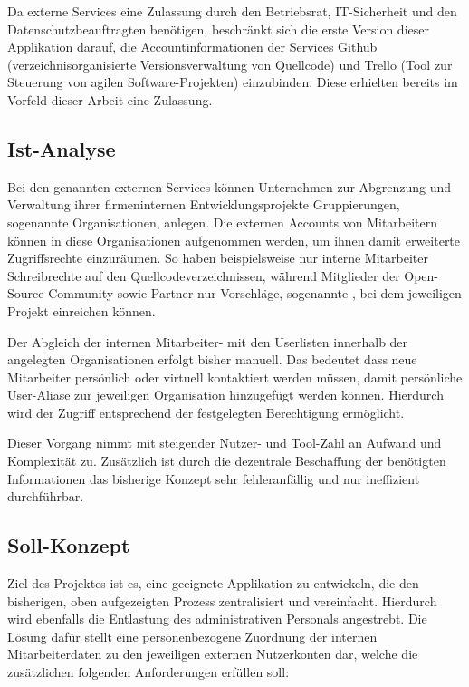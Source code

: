 Da externe Services eine Zulassung durch den Betriebsrat, IT-Sicherheit und den Datenschutzbeauftragten
benötigen, beschränkt sich die erste Version dieser Applikation darauf, die Accountinformationen der
Services Github (verzeichnisorganisierte Versionsverwaltung von Quellcode) und Trello
(Tool zur Steuerung von agilen Software-Projekten) einzubinden. Diese erhielten bereits im Vorfeld
dieser Arbeit eine Zulassung.

\subsection{Ist-Analyse}
\label{sec:Ist-Analyse}
Bei den genannten externen Services können Unternehmen zur Abgrenzung und
Verwaltung ihrer firmeninternen Entwicklungsprojekte Gruppierungen, sogenannte Organisationen, anlegen.
Die externen Accounts von Mitarbeitern können in diese Organisationen aufgenommen werden,
um ihnen damit erweiterte Zugriffsrechte einzuräumen.
So haben beispielsweise nur interne Mitarbeiter Schreibrechte auf den Quellcodeverzeichnissen, während
Mitglieder der Open-Source-Community sowie Partner nur Vorschläge, sogenannte
, bei dem jeweiligen Projekt einreichen können.

Der Abgleich der internen Mitarbeiter- mit den Userlisten innerhalb der angelegten Organisationen
erfolgt bisher manuell. Das bedeutet dass neue Mitarbeiter persönlich oder virtuell
kontaktiert werden müssen, damit persönliche User-Aliase zur jeweiligen Organisation hinzugefügt
werden können. Hierdurch wird der Zugriff entsprechend der festgelegten Berechtigung ermöglicht.

Dieser Vorgang nimmt mit steigender Nutzer- und Tool-Zahl an Aufwand und Komplexität zu.
Zusätzlich ist durch die dezentrale Beschaffung der benötigten Informationen das bisherige
Konzept sehr fehleranfällig und nur ineffizient durchführbar.

\subsection{Soll-Konzept}
\label{sec:Soll-Konzept}
Ziel des Projektes ist es, eine geeignete Applikation zu entwickeln, die den bisherigen, oben
aufgezeigten Prozess zentralisiert und vereinfacht. Hierdurch wird ebenfalls die Entlastung des
administrativen Personals angestrebt. Die Lösung dafür stellt eine personenbezogene Zuordnung der
internen Mitarbeiterdaten zu den jeweiligen externen Nutzerkonten dar, welche die zusätzlichen folgenden
Anforderungen erfüllen soll:

